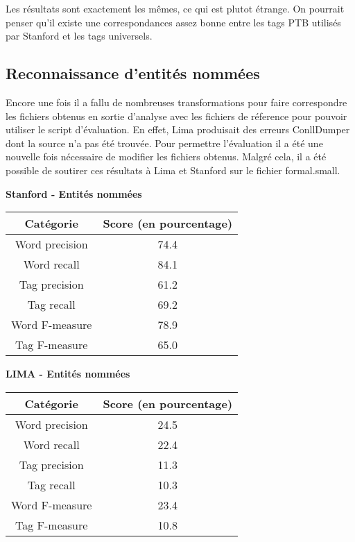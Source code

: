 \documentclass[12pt]{report}
\begin{document}
Les résultats sont exactement les mêmes, ce qui est plutot étrange. On pourrait penser qu'il existe une correspondances assez bonne entre les tags PTB utilisés par Stanford et les tags universels.

\subsection{Reconnaissance d’entités nommées}

Encore une fois il a fallu de nombreuses transformations pour faire correspondre les fichiers obtenus en sortie d'analyse avec les fichiers de réference pour pouvoir utiliser le script d'évaluation. En effet, Lima produisait des erreurs ConllDumper dont la source n'a pas été trouvée. Pour permettre l'évaluation il a été une nouvelle fois nécessaire de modifier les fichiers obtenus. Malgré cela, il a été possible de soutirer ces résultats à Lima et Stanford sur le fichier formal.small.

\textbf{Stanford - Entités nommées}

\begin{tabular}{c c}
\hline
  Catégorie & Score (en pourcentage) \\
\hline
    Word precision & 74.4 \\
    Word recall & 84.1 \\
    Tag precision & 61.2 \\
    Tag recall & 69.2 \\
    Word F-measure & 78.9 \\
    Tag F-measure & 65.0 \\
    
\end{tabular}

\vspace{15mm}
\newpage

\textbf{LIMA - Entités nommées}


\begin{tabular}{c c}
\hline
  Catégorie & Score (en pourcentage) \\
\hline
    Word precision & 24.5 \\
    Word recall & 22.4 \\
    Tag precision & 11.3 \\
    Tag recall & 10.3 \\
    Word F-measure & 23.4 \\
    Tag F-measure & 10.8 \\
    
\end{tabular}
\end{document}
